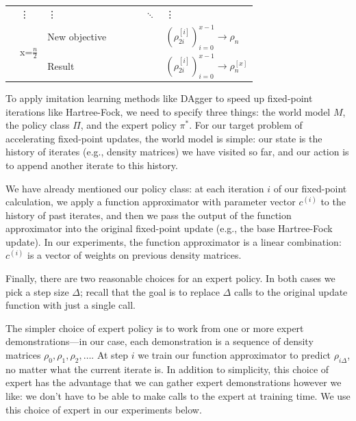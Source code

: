 \documentclass[twoside,11pt]{article}
\begin{document}
\begin{table}[htp!]
{\begin{tabular}{|l|l|l|l|l|l|l|l|}
	& \vdots      & \vdots      &                &                &                & $\ddots$ &   \vdots \\ \cline{2-8} 
	& \multirow{2}{*}{ x=$\frac{n}{2}$} & New objective         &                         &                          &                            &  & $(\rho_{2i}^{[i]})_{i=0}^{x-1} \rightarrow \rho_{n}$     \\ \cline{3-8} 
	&                & Result  &                &                &                &  & $(\rho_{2i}^{[i]})_{i=0}^{x-1}\rightarrow \rho_{n}^{[x]}$ \\ \hline
	\end{tabular}}
	\label{tab:DAgger}
	\end{table}
To apply imitation learning methods like DAgger to speed up fixed-point iterations like Hartree-Fock, we need to specify three things: the world model $M$, the policy class $\Pi$, and the expert policy $\pi^*$. For our target problem of accelerating fixed-point updates, the world model is simple: our state is the history of iterates (e.g., density matrices) we have visited so far, and our action is to append another iterate to this history.

We have already mentioned our policy class: at each iteration $i$ of our fixed-point calculation, we apply a function approximator with parameter vector $c^{(i)}$ to the history of past iterates, and then we pass the output of the function approximator into the original fixed-point update (e.g., the base Hartree-Fock update).  In our experiments, the function approximator is a linear combination: $c^{(i)}$ is a vector of weights on previous density matrices.  

Finally, there are two reasonable choices for an expert policy. In both cases we pick a step size $\Delta$; recall that the goal is to replace $\Delta$ calls to the original update function with just a single call.

The simpler choice of expert policy is to work from one or more expert demonstrations---in our case, each demonstration is a sequence of density matrices $\rho_0,\rho_1,\rho_2,\ldots$.  At step $i$ we train our function approximator to predict $\rho_{i \Delta}$, no matter what the current iterate is. In addition to simplicity, this choice of expert has the advantage that we can gather expert demonstrations however we like: we don't have to be able to make calls to the expert at training time. We use this choice of expert in our experiments below.
\end{document}
